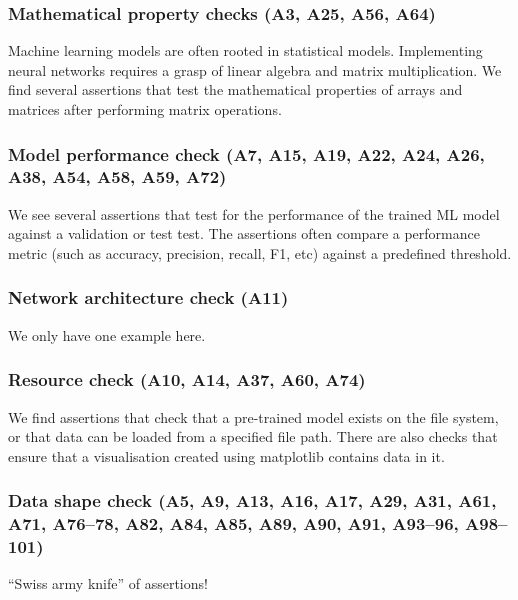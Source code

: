 
\subsubsection{Mathematical property checks (A3, A25, A56, A64)}

Machine learning models are often rooted in statistical models. Implementing neural networks requires a grasp of linear algebra and matrix multiplication. We find several assertions that test the mathematical properties of arrays and matrices after performing matrix operations.

\subsubsection{Model performance check (A7, A15, A19, A22, A24, A26, A38, A54, A58, A59, A72)}

We see several assertions that test for the performance of the trained ML model against a validation or test test. The assertions often compare a performance metric (such as accuracy, precision, recall, F1, etc) against a predefined threshold.

\subsubsection{Network architecture check (A11)}

We only have one example here.

\subsubsection{Resource check (A10, A14, A37, A60, A74)}

We find assertions that check that a pre-trained model exists on the file system, or that data can be loaded from a specified file path. There are also checks that ensure that a visualisation created using matplotlib contains data in it.

\subsubsection{Data shape check (A5, A9, A13, A16, A17, A29, A31, A61, A71, A76--78, A82, A84, A85, A89, A90, A91, A93--96, A98--101)}

``Swiss army knife'' of assertions!

